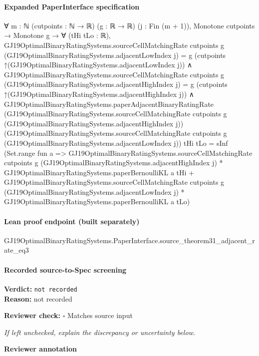 \documentclass[10pt]{article}
\newcommand{\reviewerbox}{%
  \par\noindent\fbox{\parbox{0.96\linewidth}{\rule{0pt}{0.38in}}}\par
}
\newcommand{\reviewmatch}[1]{%
  \par\noindent\textbf{Reviewer check:} $\square$\; #1\par
  \noindent\emph{If left unchecked, explain the discrepancy or uncertainty below.}\par
}
\begin{document}
\paragraph{Expanded PaperInterface specification}
\begin{ReviewVerbatim}
∀ {m : ℕ} (cutpoints : ℕ → ℝ) (g : ℝ → ℝ) (j : Fin (m + 1)),
  Monotone cutpoints →
    Monotone g →
      ∀ (tHi tLo : ℝ),
        GJ19OptimalBinaryRatingSystems.sourceCellMatchingRate cutpoints g
              (GJ19OptimalBinaryRatingSystems.adjacentLowIndex j) =
            g (cutpoints ↑(GJ19OptimalBinaryRatingSystems.adjacentLowIndex j)) ∧
          GJ19OptimalBinaryRatingSystems.sourceCellMatchingRate cutpoints g
                (GJ19OptimalBinaryRatingSystems.adjacentHighIndex j) =
              g (cutpoints ↑(GJ19OptimalBinaryRatingSystems.adjacentHighIndex j)) ∧
            GJ19OptimalBinaryRatingSystems.paperAdjacentBinaryRatingRate
                (GJ19OptimalBinaryRatingSystems.sourceCellMatchingRate cutpoints g
                  (GJ19OptimalBinaryRatingSystems.adjacentHighIndex j))
                (GJ19OptimalBinaryRatingSystems.sourceCellMatchingRate cutpoints g
                  (GJ19OptimalBinaryRatingSystems.adjacentLowIndex j))
                tHi tLo =
              sInf
                (Set.range fun a =>
                  GJ19OptimalBinaryRatingSystems.sourceCellMatchingRate cutpoints g
                        (GJ19OptimalBinaryRatingSystems.adjacentHighIndex j) *
                      GJ19OptimalBinaryRatingSystems.paperBernoulliKL a tHi +
                    GJ19OptimalBinaryRatingSystems.sourceCellMatchingRate cutpoints g
                        (GJ19OptimalBinaryRatingSystems.adjacentLowIndex j) *
                      GJ19OptimalBinaryRatingSystems.paperBernoulliKL a tLo)
\end{ReviewVerbatim}

\paragraph{Lean proof endpoint (built separately)}\begin{ReviewVerbatim}
GJ19OptimalBinaryRatingSystems.PaperInterface.source_theorem31_adjacent_rate_eq3
\end{ReviewVerbatim}

\paragraph{Recorded source-to-Spec screening}
\textbf{Verdict:} \texttt{not recorded}
\\
\textbf{Reason:} not recorded
\reviewmatch{Matches source input}
\noindent\textbf{Reviewer annotation}\par
\reviewerbox
\clearpage
\hypertarget{source-claim-50a2d9627ea4a9d0}{}
\end{document}
